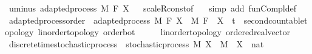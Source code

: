 \begin{isabellebody}
\ uminus{\isacharcolon}{\kern0pt}\ {\isachardoublequoteopen}adapted{\isacharunderscore}{\kern0pt}process\ M\ F\ {\isacharparenleft}{\kern0pt}{\isacharminus}{\kern0pt}X{\isacharparenright}{\kern0pt}{\isachardoublequoteclose}%
\isadelimproof
\ %
\endisadelimproof
%
\isatagproof
{}\isamarkupfalse%
\ scaleR{\isacharunderscore}{\kern0pt}const{\isacharbrackleft}{\kern0pt}of\ {\isachardoublequoteopen}{\isacharminus}{\kern0pt}{}{\isachardoublequoteclose}{\isacharbrackright}{\kern0pt}\ \isamarkupfalse%
\ {\isacharparenleft}{\kern0pt}simp\ add{\isacharcolon}{\kern0pt}\ fun{\isacharunderscore}{\kern0pt}Compl{\isacharunderscore}{\kern0pt}def{\isacharparenright}{\kern0pt}%
\endisatagproof
{\isafoldproof}%
%
\isadelimproof
%
\endisadelimproof
\isanewline
\isanewline
{}\isamarkupfalse%
\isanewline
\isanewline
{}\isamarkupfalse%
\ adapted{\isacharunderscore}{\kern0pt}process{\isacharunderscore}{\kern0pt}order\ {\isacharequal}{\kern0pt}\ adapted{\isacharunderscore}{\kern0pt}process\ M\ F\ X\ \ M\ F\ \ X\ {\isacharcolon}{\kern0pt}{\isacharcolon}{\kern0pt}\ {\isachardoublequoteopen}{\isacharprime}{\kern0pt}t\ {\isacharcolon}{\kern0pt}{\isacharcolon}{\kern0pt}\ {\isacharbraceleft}{\kern0pt}second{\isacharunderscore}{\kern0pt}countable{\isacharunderscore}{\kern0pt}topology{\isacharcomma}{\kern0pt}\ linorder{\isacharunderscore}{\kern0pt}topology{\isacharcomma}{\kern0pt}\ order{\isacharunderscore}{\kern0pt}bot{\isacharbraceright}{\kern0pt}\ {\isasymRightarrow}\ {\isacharunderscore}{\kern0pt}\ {\isasymRightarrow}\ {\isacharunderscore}{\kern0pt}\ {\isacharcolon}{\kern0pt}{\isacharcolon}{\kern0pt}\ {\isacharbraceleft}{\kern0pt}linorder{\isacharunderscore}{\kern0pt}topology{\isacharcomma}{\kern0pt}\ ordered{\isacharunderscore}{\kern0pt}real{\isacharunderscore}{\kern0pt}vector{\isacharbraceright}{\kern0pt}{\isachardoublequoteclose}%
\isadelimdocument
%
\endisadelimdocument
%
\isatagdocument
%
\isamarkuptrue%
%
\endisatagdocument
{\isafolddocument}%
%
\isadelimdocument
%
\endisadelimdocument
{}\isamarkupfalse%
\ discrete{\isacharunderscore}{\kern0pt}time{\isacharunderscore}{\kern0pt}stochastic{\isacharunderscore}{\kern0pt}process\ {\isacharequal}{\kern0pt}\ stochastic{\isacharunderscore}{\kern0pt}process\ M\ X\ \ M\ \ X\ {\isacharcolon}{\kern0pt}{\isacharcolon}{\kern0pt}\ {\isachardoublequoteopen}nat\ {\isasymRightarrow}\ {\isacharunderscore}{\kern0pt}\ {\isasymRightarrow}\ {\isacharunderscore}{\kern0pt}{\isachardoublequoteclose}\isanewline

\end{isabellebody}
